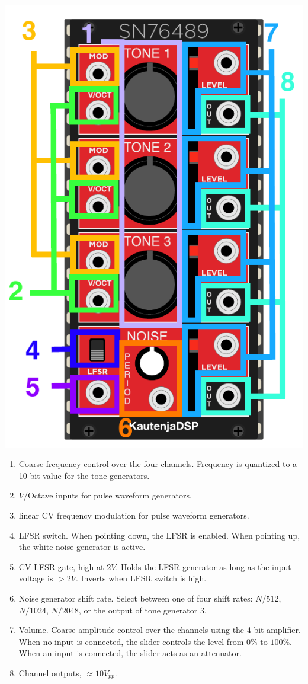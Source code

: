 \documentclass[12pt,a4paper]{article}
\begin{document}
\begin{center}
\includegraphics{SN76489-Manual}
\end{center}

\begin{enumerate}
  \item Coarse frequency control over the four channels. Frequency is quantized to a 10-bit value for the tone generators.
  \item $V$/Octave inputs for pulse waveform generators.
  \item linear CV frequency modulation for pulse waveform generators.
  \item LFSR switch. When pointing down, the LFSR is enabled. When pointing up, the white-noise generator is active.
  \item CV LFSR gate, high at $2V$. Holds the LFSR generator as long as the input voltage is $>2V$. Inverts when LFSR switch is high.
  \item Noise generator shift rate. Select between one of four shift rates: $N/512$, $N/1024$, $N/2048$, or the output of tone generator 3.
  \item Volume. Coarse amplitude control over the channels using the 4-bit amplifier. When no input is connected, the slider controls the level from $0\%$ to $100\%$. When an input is connected, the slider acts as an attenuator.
  \item Channel outputs, ${\approx}10V_{pp}$.
\end{enumerate}


\clearpage
\renewcommand\refname{References \& Acknowledgments}
\nocite{*}


\end{document}
